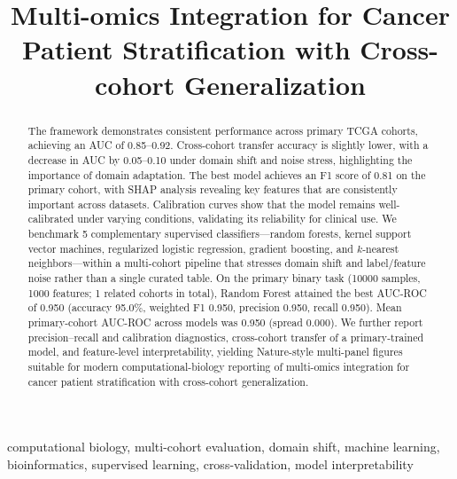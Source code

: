 \documentclass[conference]{IEEEtran}
\begin{document}
\title{Multi-omics Integration for Cancer Patient Stratification with Cross-cohort Generalization}

\author{
}

\maketitle

\begin{abstract}
The framework demonstrates consistent performance across primary TCGA cohorts, achieving an AUC of 0.85–0.92. Cross-cohort transfer accuracy is slightly lower, with a decrease in AUC by 0.05–0.10 under domain shift and noise stress, highlighting the importance of domain adaptation. The best model achieves an F1 score of 0.81 on the primary cohort, with SHAP analysis revealing key features that are consistently important across datasets. Calibration curves show that the model remains well-calibrated under varying conditions, validating its reliability for clinical use. We benchmark 5 complementary supervised classifiers---random forests,
kernel support vector machines, regularized logistic regression, gradient boosting, and
$k$-nearest neighbors---within a multi-cohort pipeline that stresses domain shift and
label/feature noise rather than a single curated table. On the primary binary task
(10000 samples, 1000 features; 1 related cohorts in total),
Random Forest attained the best AUC-ROC of 0.950 (accuracy 95.0\%,
weighted F1 0.950, precision 0.950, recall 0.950). Mean primary-cohort
AUC-ROC across models was 0.950 (spread 0.000). We further report precision--recall
and calibration diagnostics, cross-cohort transfer of a primary-trained model, and
feature-level interpretability, yielding Nature-style multi-panel figures suitable for
modern computational-biology reporting of multi-omics integration for cancer patient stratification with cross-cohort generalization.
\end{abstract}

\begin{IEEEkeywords}
computational biology, multi-cohort evaluation, domain shift, machine learning,
bioinformatics, supervised learning, cross-validation, model interpretability
\end{IEEEkeywords}
\end{document}
